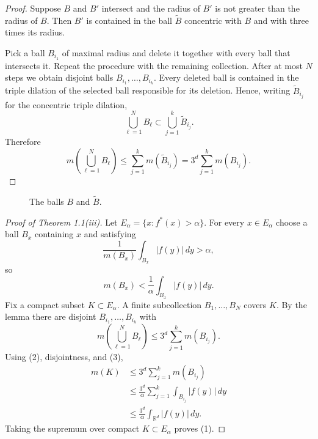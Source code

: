 \documentclass[11pt,openany]{book}
\begin{document}
\begin{proof}
Suppose $B$ and $B'$ intersect and the radius of $B'$ is not greater than the radius of $B$. Then $B'$ is contained in the ball $\widetilde B$ concentric with $B$ and with three times its radius.

Pick a ball $B_{i_1}$ of maximal radius and delete it together with every ball that intersects it. Repeat the procedure with the remaining collection. After at most $N$ steps we obtain disjoint balls $B_{i_1},\ldots,B_{i_k}$. Every deleted ball is contained in the triple dilation of the selected ball responsible for its deletion. Hence, writing $\widetilde B_{i_j}$ for the concentric triple dilation,
\[
\bigcup_{\ell=1}^N B_\ell\subset \bigcup_{j=1}^k\widetilde B_{i_j}.
\]
Therefore
\[
m\left(\bigcup_{\ell=1}^N B_\ell\right)
\le \sum_{j=1}^k m(\widetilde B_{i_j})
=3^d\sum_{j=1}^k m(B_{i_j}).
\]
\end{proof}

\begin{figure}[ht]
\centering
{}
\caption{The balls $B$ and $\widetilde B$.}
\end{figure}

\begin{proof}[Proof of Theorem 1.1(iii)]
Let $E_\alpha=\{x:f^*(x)>\alpha\}$. For every $x\in E_\alpha$ choose a ball $B_x$ containing $x$ and satisfying
\[
\frac1{m(B_x)}\int_{B_x}|f(y)|\,dy>\alpha,
\]
so
\begin{equation}
m(B_x)<\frac1\alpha\int_{B_x}|f(y)|\,dy.
\tag{2}
\end{equation}
Fix a compact subset $K\subset E_\alpha$. A finite subcollection $B_1,\ldots,B_N$ covers $K$. By the lemma there are disjoint $B_{i_1},\ldots,B_{i_k}$ with
\begin{equation}
m\left(\bigcup_{\ell=1}^N B_\ell\right)
\le3^d\sum_{j=1}^k m(B_{i_j}).
\tag{3}
\end{equation}
Using (2), disjointness, and (3),
\begin{align*}
m(K)
&\le3^d\sum_{j=1}^k m(B_{i_j})\\
&\le \frac{3^d}{\alpha}\sum_{j=1}^k\int_{B_{i_j}}|f(y)|\,dy\\
&\le \frac{3^d}{\alpha}\int_{\mathbb R^d}|f(y)|\,dy.
\end{align*}
Taking the supremum over compact $K\subset E_\alpha$ proves (1).
\end{proof}
\end{document}
